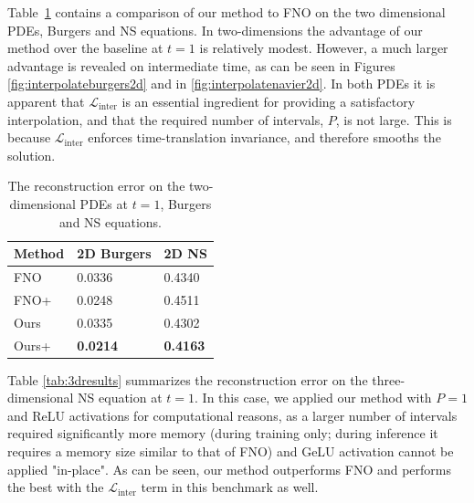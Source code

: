 \documentclass{article}
\theoremstyle{plain}
\theoremstyle{definition}
\theoremstyle{remark}
\newcommand{\linter}{{{\mathcal{L}}_{\text{inter}}}}
\begin{document}
Table~\ref{tab:2dresults} contains a comparison of our method to FNO on the two dimensional PDEs, Burgers and NS equations. In two-dimensions the advantage of our method over the baseline at $t=1$ is relatively modest. However, a much larger advantage is revealed on intermediate time, as can be seen in Figures \ref{fig:interpolateburgers2d} and in  \ref{fig:interpolatenavier2d}. In both PDEs it is apparent that $\linter$ is an essential ingredient for providing a satisfactory interpolation, and that the required number of intervals, $P$, is not large. This is because $\linter$ enforces time-translation invariance, and therefore smooths the solution.  
\begin{table}[t]
\caption{The reconstruction error on the two-dimensional PDEs at $t=1$, Burgers and NS  equations.}
\label{tab:2dresults}
\begin{center}
\begin{tabular}{lll}
\toprule
                                   Method &      2D Burgers & 2D NS \\
\midrule
                                      FNO &          0.0336 &           0.4340 \\
                                      FNO+ & 0.0248 & 0.4511 \\
                               Ours  &          0.0335 &   0.4302 \\
                               Ours+ & \textbf{0.0214} & \textbf{0.4163} \\
\bottomrule
\end{tabular}
\end{center}
\end{table}







Table \ref{tab:3dresults} summarizes the reconstruction error on the three-dimensional NS equation at $t=1$. In this case, we applied our method with $P=1$ and ReLU activations for computational reasons, as a larger number of intervals required significantly more memory (during training only; during inference it requires a memory size similar to that of FNO) and GeLU activation cannot be applied "in-place". As can be seen, our method outperforms FNO and performs the best with the $\linter$ term in this benchmark as well.
\end{document}
